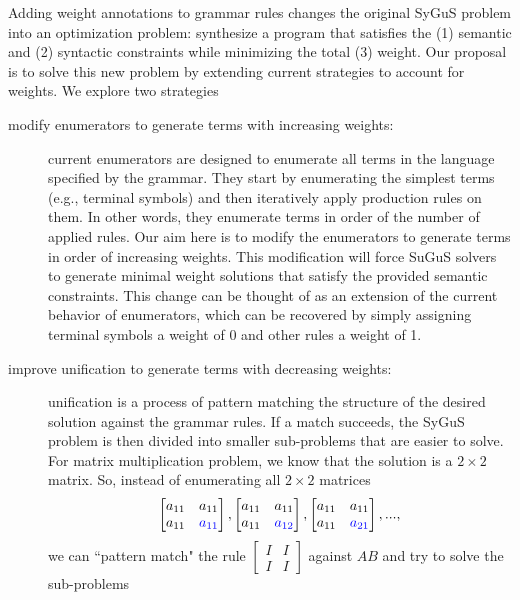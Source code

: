 Adding weight annotations to grammar rules changes the original SyGuS problem into an optimization problem:
%
synthesize a program that satisfies the (1) semantic and (2) syntactic constraints while minimizing the total (3) weight.
%
Our proposal is to solve this new problem by extending current strategies to account for weights.
%
We explore two strategies
%
\begin{description}
\item[modify enumerators to generate terms with increasing weights:]
%
current enumerators are designed to enumerate all terms in the language specified by the grammar.
%
They start by enumerating the simplest terms (e.g., terminal symbols) and then iteratively apply production rules on them.
%
In other words, they enumerate terms in order of the number of applied rules.
%
Our aim here is to modify the enumerators to generate terms in order of increasing weights.
%
This modification will force SuGuS solvers to generate minimal weight solutions that satisfy the provided semantic constraints.
%
This change can be thought of as an extension of the current behavior of enumerators,
%
which can be recovered by simply assigning terminal symbols a weight of 0 and other rules a weight of 1.
%
\item[improve unification to generate terms with decreasing weights:]
%
unification is a process of pattern matching the structure of the desired solution against the grammar rules.
%
If a match succeeds, the SyGuS problem is then divided into smaller sub-problems that are easier to solve.
%
For matrix multiplication problem, we know that the solution is a $2 \times 2$ matrix. So, instead of enumerating all $2 \times 2$ matrices
%
\begin{equation}
\begin{bmatrix} a_{11} & a_{11} \\ a_{11} & \textcolor{blue}{a_{11}} \end{bmatrix},
\begin{bmatrix} a_{11} & a_{11} \\ a_{11} & \textcolor{blue}{a_{12}} \end{bmatrix},
\begin{bmatrix} a_{11} & a_{11} \\ a_{11} & \textcolor{blue}{a_{21}} \end{bmatrix},
...,
\label{eq:sequence-matrices}
\end{equation}
%
we can ``pattern match" the rule $\begin{bmatrix} I & I \\ I & I \end{bmatrix}$ against $AB$ and try to solve the sub-problems

\end{description}

